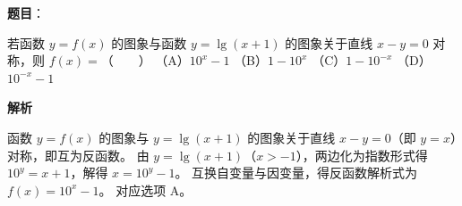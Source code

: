 \begin{answer}

\textbf{题目}：

若函数 $y = f(x)$ 的图象与函数 $y = \lg(x + 1)$ 的图象关于直线 $x - y = 0$ 对称，则 $f(x) =$\mbox{（　　）}
（A）$10^x - 1$
（B）$1 - 10^x$
（C）$1 - 10^{-x}$
（D）$10^{-x} - 1$

\textbf{解析}

函数 $y = f(x)$ 的图象与 $y = \lg(x + 1)$ 的图象关于直线 $x - y = 0$（即 $y = x$）对称，即互为反函数。
由 $y = \lg(x + 1)$（$x > -1$），两边化为指数形式得 $10^y = x + 1$，解得 $x = 10^y - 1$。
互换自变量与因变量，得反函数解析式为 $f(x) = 10^x - 1$。
对应选项 A。


\end{answer}
